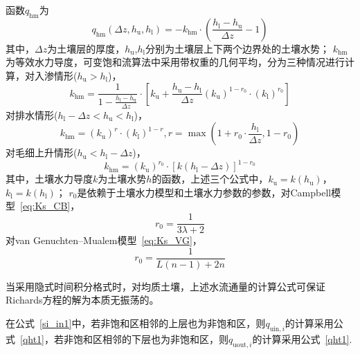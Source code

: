 \begin{enumerate}
    函数$q_{\mathrm{hm}}$为
    \begin{equation}
      q_{\mathrm{h m}}\left(\Delta z, h_{\mathrm{u}}, h_{\mathrm{l}}\right)=-k_{\mathrm{h m}} \cdot\left(\frac{h_{\mathrm{l}}-h_{\mathrm{u}}}{\Delta z}-1\right)
    \end{equation}
    其中，$\Delta z$为土壤层的厚度，$h_{\mathrm {u}} $,$h_{\mathrm {l}} $分别为土壤层上下两个边界处的土壤水势；
    $k_{\mathrm{hm}}$为等效水力导度，可变饱和流算法中采用带权重的几何平均，分为三种情况进行计算，对入渗情形($h_{\mathrm {u}} >h_{\mathrm {l}} $)，
    \begin{equation}
      k_{\mathrm{h m}}=\frac{1}{1-\frac{h_{\mathrm{l}}-h_{\mathrm{u}}}{\Delta z}} \cdot\left[k_{\mathrm{u}}+\frac{h_{\mathrm{u}}-h_{\mathrm{l}}}{\Delta z}\left(k_{\mathrm{u}}\right)^{1-r_{0}} \cdot\left(k_{\mathrm{l}}\right)^{r_{0}}\right]
    \end{equation}
    对排水情形($h_{\mathrm {l}} -\Delta z<h_{\mathrm {u}} <h_{\mathrm {l}} $)，
    \begin{equation}
      k_{\mathrm{h m}}=\left(k_{\mathrm{u}}\right)^{r} \cdot\left(k_{\mathrm{l}}\right)^{1-r}, r=\max \left(1+r_{0} \cdot \frac{h_{\mathrm{l}}}{\Delta z}, 1-r_{0}\right)
    \end{equation}
    对毛细上升情形($h_{\mathrm {u}} <h_{\mathrm {l}} -\Delta z$)，
    \begin{equation}
      k_{\mathrm{h m}}=\left(k_{\mathrm{u}}\right)^{r_{0}} \cdot\left[k\left(h_{\mathrm{l}}-\Delta z\right)\right]^{1-r_{0}}
    \end{equation}
    其中，土壤水力导度$k$为土壤水势$h$的函数，上述三个公式中，$k_{\mathrm {u}} =k(h_{\mathrm {u}}  )$，$k_{\mathrm {l}} =k(h_{\mathrm {l}}  )$；
    $r_0$是依赖于土壤水力模型和土壤水力参数的参数，对Campbell模型~\eqref{eq:Ks_CB}，
    \begin{equation}
      r_{0}=\frac{1}{3 \lambda+2}
    \end{equation}
    对van Genuchten--Mualem模型~\eqref{eq:Ks_VG}，
    \begin{equation}
      r_{0}=\frac{1}{L(n-1)+2 n}
    \end{equation}

    当采用隐式时间积分格式时，对均质土壤，上述水流通量的计算公式可保证Richards方程的解为本质无振荡的。

    在公式~\eqref{si_in1}中，若非饱和区相邻的上层也为非饱和区，则$q_{\mathrm{uin},i}$的计算采用公式~\eqref{qht1}，若非饱和区相邻的下层也为非饱和区，则$q_{\mathrm{uout},i}$的计算采用公式~\eqref{qht1}.


\end{enumerate}
